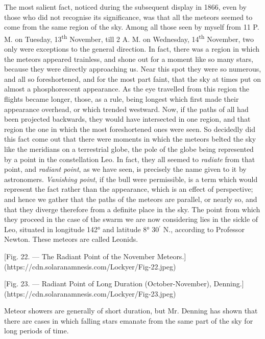 \documentclass[a4paper, 12pt, oneside, polutonikogreek, english]{article}
\begin{document}
The most salient fact, noticed during the subsequent display in 1866, even by those who did not recognise its significance, was that all the meteors seemed to come from the same region of the sky. Among all those seen by myself from 11 P. M. on Tuesday, 13\textsuperscript{th} November, till 2 A. M. on Wednesday, 14\textsuperscript{th} November, two only were exceptions to the general direction. In fact, there was a region in which the meteors appeared trainless, and shone out for a moment like so many stars, because they were directly approaching us. Near this spot they were so numerous, and all so foreshortened, and for the most part faint, that the sky at times put on almost a phosphorescent appearance. As the eye travelled from this region the flights became longer, those, as a rule, being longest which first made their appearance overhead, or which trended westward. Now, if the paths of all had been projected backwards, they would have intersected in one region, and that region the one in which the most foreshortened ones were seen. So decidedly did this fact come out that there were moments in which the meteors belted the sky like the meridians on a terrestrial globe, the pole of the globe being represented by a point in the constellation Leo. In fact, they all seemed to \emph{radiate} from that point, and \emph{radiant point}, as we have seen, is precisely the name given to it by astronomers. \emph{Vanishing point}, if the bull were permissible, is a term which would represent the fact rather than the appearance, which is an effect of perspective; and hence we gather that the paths of the meteors are parallel, or nearly so, and that they diverge therefore from a definite place in the sky. The point from which they proceed in the case of the swarm we are now considering lies in the sickle of Leo, situated in longitude 142° and latitude 8° 30$^{\prime}$ N., according to Professor Newton. These meteors are called Leonids.

[Fig. 22. --- The Radiant Point of the November Meteors.](https://cdn.solaranamnesis.com/Lockyer/Fig-22.jpeg)

[Fig. 23. --- Radiant Point of Long Duration (October-November), Denning.](https://cdn.solaranamnesis.com/Lockyer/Fig-23.jpeg)

Meteor showers are generally of short duration, but Mr. Denning has shown that there are cases in which falling stars emanate from the same part of the sky for long periods of time.
\end{document}
